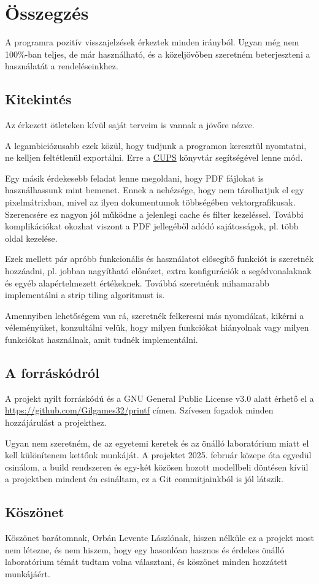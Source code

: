 \chapter{Összegzés}

A programra pozitív visszajelzések érkeztek minden irányból. Ugyan még nem 100\%-ban teljes, de már használható, és a közeljövőben szeretném beterjeszteni a használatát a rendeléseinkhez.

\section{Kitekintés}

Az érkezett ötleteken kívül saját terveim is vannak a jövőre nézve.

A legambiciózusabb ezek közül, hogy tudjunk a programon keresztül nyomtatni, ne kelljen feltétlenül exportálni. Erre a \href{https://en.wikipedia.org/wiki/CUPS}{CUPS} könyvtár segítségével lenne mód.

Egy másik érdekesebb feladat lenne megoldani, hogy PDF fájlokat is használhassunk mint bemenet. Ennek a nehézsége, hogy nem tárolhatjuk el egy pixelmátrixban, mivel az ilyen dokumentumok többségében vektorgrafikusak. Szerencsére ez nagyon jól működne a jelenlegi cache és filter kezeléssel. További komplikációkat okozhat viszont a PDF jellegéből adódó sajátosságok, pl. több oldal kezelése.

Ezek mellett pár apróbb funkcionális és használatot elősegítő funkciót is szeretnék hozzáadni, pl. jobban nagyítható előnézet, extra konfigurációk a segédvonalaknak és egyéb alapértelmezett értékeknek. Továbbá szeretnénk mihamarabb implementálni a strip tiling algoritmust is.

Amennyiben lehetőségem van rá, szeretnék felkeresni más nyomdákat, kikérni a véleményüket, konzultálni velük, hogy milyen funkciókat hiányolnak vagy milyen funkciókat használnak, amit tudnék implementálni.

\section{A forráskódról}

A projekt nyílt forráskódú és a GNU General Public License v3.0 alatt érhető el a \href{https://github.com/Gilgames32/printf}{https://github.com/Gilgames32/printf} címen. Szívesen fogadok minden hozzájárulást a projekthez. 

Ugyan nem szeretném, de az egyetemi keretek és az önálló laboratórium miatt el kell különítenem kettőnk munkáját. A projektet 2025. február közepe óta egyedül csinálom, a build rendszeren és egy-két közösen hozott modellbeli döntésen kívül a projektben mindent én csináltam, ez a Git commitjainkból is jól látszik.

\section{Köszönet}

Köszönet barátomnak, Orbán Levente Lászlónak, hiszen nélküle ez a projekt most nem létezne, és nem hiszem, hogy egy hasonlóan hasznos és érdekes önálló laboratórium témát tudtam volna választani, és köszönet minden hozzátett munkájáért.
